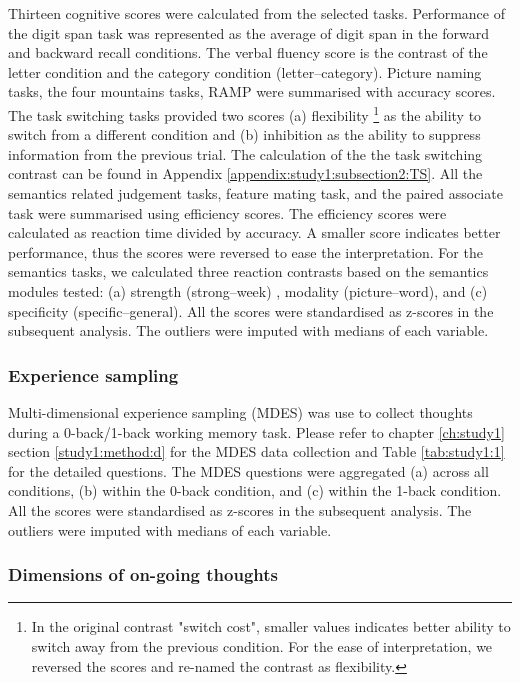 Thirteen cognitive scores were calculated from the selected tasks. Performance of the digit span task was represented as the average of digit span in the forward and backward recall conditions. The verbal fluency score is the contrast of the letter condition and the category condition (letter--category). Picture naming tasks, the four mountains tasks, RAMP were summarised with accuracy scores. The task switching tasks provided two scores (a) flexibility
\footnote{
In the original contrast "switch cost", smaller values indicates better ability to switch away from the previous condition. For the ease of interpretation, we reversed the scores and re-named the contrast as flexibility.}
as the ability to switch from a different condition and (b) inhibition as the ability to suppress information from the previous trial. The calculation of the the task switching contrast can be found in Appendix \ref{appendix:study1:subsection2:TS}. All the semantics related judgement tasks, feature mating task, and the paired associate task were summarised using efficiency scores. The efficiency scores were calculated as reaction time divided by accuracy. A smaller score indicates better performance, thus the scores were reversed to ease the interpretation. For the semantics tasks, we calculated three reaction contrasts based on the semantics modules tested: (a) strength (strong--week) , modality (picture--word), and (c) specificity (specific--general). All the scores were standardised as z-scores in the subsequent analysis. The outliers were imputed with medians of each variable.

\subsubsection{Experience sampling}
\label{study3:method:e:mdes}
Multi-dimensional experience sampling (MDES) was use to collect thoughts during a 0-back/1-back working memory task. Please refer to chapter \ref{ch:study1} section \ref{study1:method:d} for the MDES data collection and Table \ref{tab:study1:1} for the detailed questions. The MDES questions were aggregated (a) across all conditions, (b) within the 0-back condition, and (c) within the 1-back condition. All the scores were standardised as z-scores in the subsequent analysis. The outliers were imputed with medians of each variable.


\subsubsection{Dimensions of on-going thoughts}

